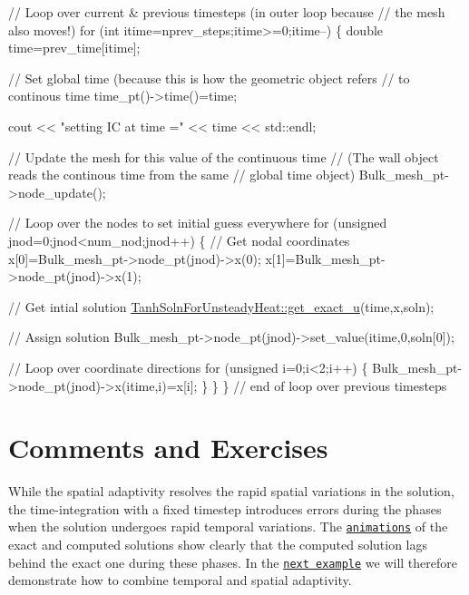 \begin{DoxyCodeInclude}
   \textcolor{comment}{// Loop over current & previous timesteps (in outer loop because}
   \textcolor{comment}{// the mesh also moves!)}
   \textcolor{keywordflow}{for} (\textcolor{keywordtype}{int} itime=nprev\_steps;itime>=0;itime--)
    \{
     \textcolor{keywordtype}{double} time=prev\_time[itime];
     
     \textcolor{comment}{// Set global time (because this is how the geometric object refers }
     \textcolor{comment}{// to continous time }
     time\_pt()->time()=time;
     
     cout << \textcolor{stringliteral}{"setting IC at time ="} << time << std::endl;
     
     \textcolor{comment}{// Update the mesh for this value of the continuous time}
     \textcolor{comment}{// (The wall object reads the continous time from the same}
     \textcolor{comment}{// global time object)}
     Bulk\_mesh\_pt->node\_update(); 
     
     \textcolor{comment}{// Loop over the nodes to set initial guess everywhere}
     \textcolor{keywordflow}{for} (\textcolor{keywordtype}{unsigned} jnod=0;jnod<num\_nod;jnod++)
      \{
       \textcolor{comment}{// Get nodal coordinates}
       x[0]=Bulk\_mesh\_pt->node\_pt(jnod)->x(0);
       x[1]=Bulk\_mesh\_pt->node\_pt(jnod)->x(1);
       
       \textcolor{comment}{// Get intial solution}
       \hyperlink{namespaceTanhSolnForUnsteadyHeat_a36857bbdec45f44018772de70558db7d}{TanhSolnForUnsteadyHeat::get\_exact\_u}(time,x,soln);
       
       \textcolor{comment}{// Assign solution}
       Bulk\_mesh\_pt->node\_pt(jnod)->set\_value(itime,0,soln[0]);
       
       \textcolor{comment}{// Loop over coordinate directions}
       \textcolor{keywordflow}{for} (\textcolor{keywordtype}{unsigned} i=0;i<2;i++)
        \{
         Bulk\_mesh\_pt->node\_pt(jnod)->x(itime,i)=x[i];
        \}
      \} 
    \} \textcolor{comment}{// end of loop over previous timesteps}

\end{DoxyCodeInclude}




 

\hypertarget{index_comm}{}\section{Comments and Exercises}\label{index_comm}
While the spatial adaptivity resolves the rapid spatial variations in the solution, the time-\/integration with a fixed timestep introduces errors during the phases when the solution undergoes rapid temporal variations. The \href{../figures/step_soln.avi}{\tt animations} of the exact and computed solutions show clearly that the computed solution lags behind the exact one during these phases. In the \href{../../two_d_unsteady_heat_2adapt/html/index.html}{\tt next example} we will therefore demonstrate how to combine temporal and spatial adaptivity.



